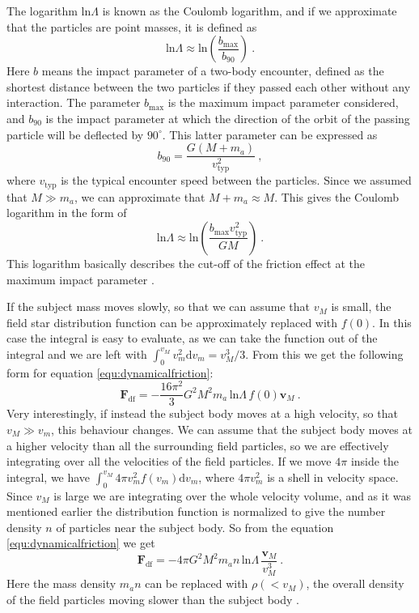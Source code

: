 \documentclass[english, oneside]{HYgradu}
\begin{document}
The logarithm $\mathrm{ln} \Lambda$ is known as the Coulomb logarithm, and if we approximate that the particles are point masses, it is defined as
\begin{equation}
\mathrm{ln} \Lambda \approx \mathrm{ln} \left( \frac{b_{\mathrm{max}}}{b_{90}} \right) \ . \label{equ:coulomblog}
\end{equation}
Here $b$ means the impact parameter of a two-body encounter, defined as the shortest distance between the two particles if they passed each other without any interaction. The parameter $b_{\mathrm{max}}$ is the maximum impact parameter considered, and $b_{90}$ is the impact parameter at which the direction of the orbit of the passing particle will be deflected by $90^{\circ}$. This latter parameter can be expressed as
\begin{equation}
b_{90} = \frac{G(M+m_a)}{v^2_{\mathrm{typ}}} \ ,
\end{equation}
where $v_{\mathrm{typ}}$ is the typical encounter speed between the particles. Since we assumed that $M \gg m_a$, we can approximate that $M+m_a \approx M$. This gives the Coulomb logarithm in the form of
\begin{equation}
\mathrm{ln} \Lambda \approx \mathrm{ln} \left( \frac{b_{\mathrm{max}} v^2_{\mathrm{typ}}}{GM} \right) \ .
\end{equation}
This logarithm basically describes the cut-off of the friction effect at the maximum impact parameter \citep{galform}.

If the subject mass moves slowly, so that we can assume that $v_M$ is small, the field star distribution function can be approximately replaced with $f(0)$. In this case the integral is easy to evaluate, as we can take the function out of the integral and we are left with $\int_0^{v_M} v_m^2 \mathrm{d} v_m = v_M^3/3$. From this we get the following form for equation \ref{equ:dynamicalfriction}: 
\begin{equation}
\mathbf{F}_{\mathrm{df}} = -\frac{16 \pi^2}{3} G^2 M^2 m_a \, \mathrm{ln} \Lambda \, f(0) \mathbf{v}_M \ . \label{equ:dynfricslow}
\end{equation}
Very interestingly, if instead the subject body moves at a high velocity, so that $v_M \gg v_m$, this behaviour changes. We can assume that the subject body moves at a higher velocity than all the surrounding field particles, so we are effectively integrating over all the velocities of the field particles. If we move $4\pi$ inside the integral, we have $\int_0^{v_M} 4 \pi v_m^2 f(v_m) \mathrm{d}v_m$, where $4 \pi v_m^2$ is a shell in velocity space. Since $v_M$ is large we are integrating over the whole velocity volume, and as it was mentioned earlier the distribution function is normalized to give the number density $n$ of particles near the subject body. So from the equation \ref{equ:dynamicalfriction} we get
\begin{equation}
\mathbf{F}_{\mathrm{df}} = -4 \pi G^2 M^2 m_a n \, \mathrm{ln} \Lambda \, \frac{\mathbf{v}_M}{v_M^3} \ . \label{equ:dynfricfast}
\end{equation}
Here the mass density $m_a n$ can be replaced with $\rho(< v_M)$, the overall density of the field particles moving slower than the subject body \citep{bt-galdyn}.
\end{document}
